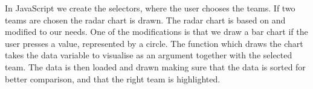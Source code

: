 \documentclass[Report.tex]{subfiles}
\begin{document}
In JavaScript we create the selectors, where the user chooses the teams. If two teams are chosen the radar chart is drawn. The radar chart is based on \cite{Radar} and modified to our needs. One of the modifications is that we draw a bar chart if the user presses a value, represented by a circle. The function which draws the chart takes the data variable to visualise as an argument together with the selected team. The data is then loaded and drawn making sure that the data is sorted for better comparison, and that the right team is highlighted.
\end{document}
